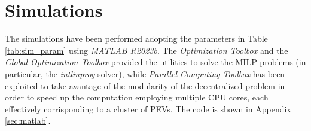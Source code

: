 \section{Simulations}
The simulations have been performed adopting the parameters in Table \ref{tab:sim_param} using \textit{MATLAB R2023b}. The \textit{Optimization Toolbox} and the \textit{Global Optimization Toolbox} provided the utilities to solve the MILP problems (in particular, the \textit{intlinprog} solver), while \textit{Parallel Computing Toolbox} has been exploited to take avantage of the modularity of the decentralized problem in order to speed up the computation employing multiple CPU cores, each effectively corrisponding to a cluster of PEVs. The code is shown in Appendix \ref{sec:matlab}.


